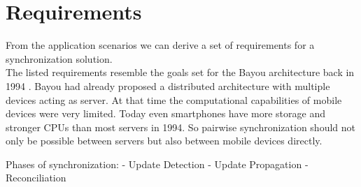 \section{Requirements}
\label{sec:requirements}
From the application scenarios we can derive a set of requirements for a synchronization solution.\\
The listed requirements resemble the goals set for the Bayou architecture back in 1994 \cite{Demers:1994vj}. 
Bayou had already proposed a distributed architecture with multiple devices acting as server.
At that time the computational capabilities of mobile devices were very limited.
Today even smartphones have more storage and stronger CPUs than most servers in 1994.
So pairwise synchronization should not only be possible between servers but also between mobile devices directly.

Phases of synchronization:
- Update Detection
- Update Propagation
- Reconciliation

